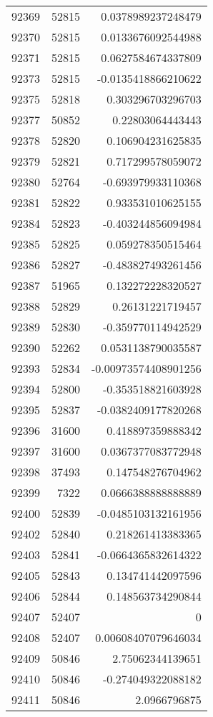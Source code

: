 \begin{tabular}{r | r | r}
92369 & 52815 & 0.0378989237248479 \\
92370 & 52815 & 0.0133676092544988 \\
92371 & 52815 & 0.0627584674337809 \\
92373 & 52815 & -0.0135418866210622 \\
92375 & 52818 & 0.303296703296703 \\
92377 & 50852 & 0.22803064443443 \\
92378 & 52820 & 0.106904231625835 \\
92379 & 52821 & 0.717299578059072 \\
92380 & 52764 & -0.693979933110368 \\
92381 & 52822 & 0.933531010625155 \\
92384 & 52823 & -0.403244856094984 \\
92385 & 52825 & 0.059278350515464 \\
92386 & 52827 & -0.483827493261456 \\
92387 & 51965 & 0.132272228320527 \\
92388 & 52829 & 0.26131221719457 \\
92389 & 52830 & -0.359770114942529 \\
92390 & 52262 & 0.0531138790035587 \\
92393 & 52834 & -0.00973574408901256 \\
92394 & 52800 & -0.353518821603928 \\
92395 & 52837 & -0.0382409177820268 \\
92396 & 31600 & 0.418897359888342 \\
92397 & 31600 & 0.0367377083772948 \\
92398 & 37493 & 0.147548276704962 \\
92399 & 7322 & 0.0666388888888889 \\
92400 & 52839 & -0.0485103132161956 \\
92402 & 52840 & 0.218261413383365 \\
92403 & 52841 & -0.0664365832614322 \\
92405 & 52843 & 0.134741442097596 \\
92406 & 52844 & 0.148563734290844 \\
92407 & 52407 & 0 \\
92408 & 52407 & 0.00608407079646034 \\
92409 & 50846 & 2.75062344139651 \\
92410 & 50846 & -0.274049322088182 \\
92411 & 50846 & 2.0966796875 \\

\end{tabular}
